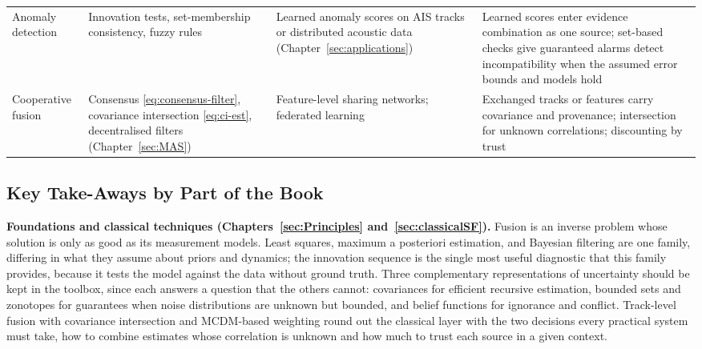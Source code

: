 \documentclass[graybox,envcountchap]{style/SNmono}
\providecommand{\DIFadd}[1]{{\protect\color{blue} #1}} %
\providecommand{\DIFdel}[1]{{\protect\color{red} #1}} %
\providecommand{\DIFaddFL}[1]{\DIFadd{#1}} %
\providecommand{\DIFdelFL}[1]{\DIFdel{#1}} %
\providecommand{\DIFaddbeginFL}{} %
\providecommand{\DIFaddendFL}{} %
\providecommand{\DIFdelbeginFL}{} %
\providecommand{\DIFdelendFL}{} %
\begin{document}
\begin{table}[!t]
\begin{tabular}{>{\raggedright\arraybackslash}p{} >{\raggedright\arraybackslash}p{} >{\raggedright\arraybackslash}p{} >{\raggedright\arraybackslash}p{}}
Anomaly detection & Innovation tests, set-membership consistency, fuzzy rules & Learned anomaly scores on AIS tracks or distributed acoustic data (Chapter~\ref{sec:applications}) & Learned scores enter evidence combination as one source; set-based checks \DIFdelbeginFL \DIFdelFL{give guaranteed alarms }\DIFdelendFL \DIFaddbeginFL \DIFaddFL{detect incompatibility when the assumed error bounds and models hold }\DIFaddendFL \\[2pt]
Cooperative fusion & Consensus \eqref{eq:consensus-filter}, covariance intersection \eqref{eq:ci-est}, decentralised filters (Chapter~\ref{sec:MAS}) & Feature-level sharing networks; federated learning & Exchanged tracks or features carry covariance and provenance; intersection for unknown correlations; discounting by trust \\
\bottomrule
\end{tabular}
\end{table}

\subsection*{Key Take-Aways by Part of the Book}

\textbf{Foundations and classical techniques (Chapters~\ref{sec:Principles} and~\ref{sec:classicalSF}).} Fusion is an inverse problem whose solution is only as good as its measurement models. Least squares, maximum a posteriori estimation, and Bayesian filtering are one family, differing in what they assume about priors and dynamics; the innovation sequence is the single most useful diagnostic that this family provides, because it tests the model against the data without ground truth. Three complementary representations of uncertainty should be kept in the toolbox, since each answers a question that the others cannot: covariances for efficient recursive estimation, bounded sets and zonotopes for guarantees when noise distributions are unknown but bounded, and belief functions for ignorance and conflict. Track-level fusion with covariance intersection and MCDM-based weighting round out the classical layer with the two decisions every practical system must take, how to combine estimates whose correlation is unknown and how much to trust each source in a given context.
\end{document}
